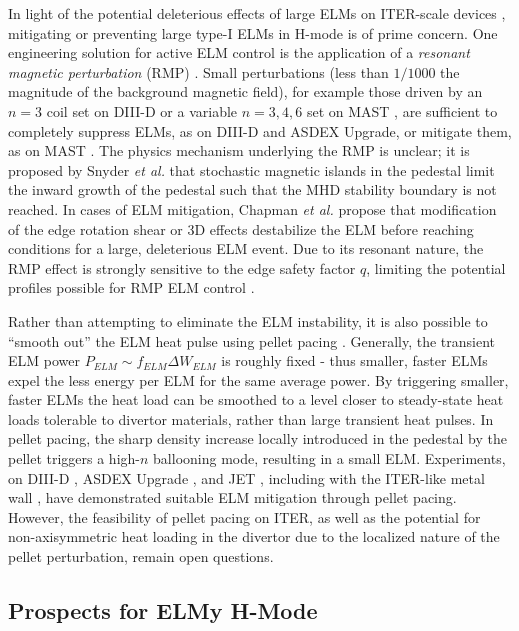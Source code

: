 In light of the potential deleterious effects of large ELMs on ITER-scale devices \cite{Loarte2003,Federici2003}, mitigating or preventing large type-I ELMs in H-mode is of prime concern.  One engineering solution for active ELM control is the application of a \emph{resonant magnetic perturbation} (RMP) \cite{Evans2004,Moyer2005,Evans2006}.  Small perturbations (less than $1/1000$ the magnitude of the background magnetic field), for example those driven by an $n=3$ coil set on DIII-D \cite{Evans2004} or a variable $n=3,4,6$ set on MAST \cite{Kirk2013}, are sufficient to completely suppress ELMs, as on DIII-D and ASDEX Upgrade, or mitigate them, as on MAST \cite{Kirk2013}.  The physics mechanism underlying the RMP is unclear; it is proposed by Snyder \emph{et al.} \cite{Snyder2012} that stochastic magnetic islands in the pedestal limit the inward growth of the pedestal such that the MHD stability boundary is not reached.  In cases of ELM mitigation, Chapman \emph{et al.} \cite{Chapman2012} propose that 
modification of the edge rotation shear or 3D effects destabilize the ELM before reaching conditions for a large, deleterious ELM event.  Due to its resonant nature, the RMP effect is strongly sensitive to the edge safety factor $q$, limiting the potential profiles possible for RMP ELM control \cite{Moyer2005}.

Rather than attempting to eliminate the ELM instability, it is also possible to ``smooth out'' the ELM heat pulse using pellet pacing \cite{Baylor2013}.  Generally, the transient ELM power $P_{ELM} \sim f_{ELM} \Delta W_{ELM}$ is roughly fixed - thus smaller, faster ELMs expel the less energy per ELM for the same average power.  By triggering smaller, faster ELMs the heat load can be smoothed to a level closer to steady-state heat loads tolerable to divertor materials, rather than large transient heat pulses.  In pellet pacing, the sharp density increase locally introduced in the pedestal by the pellet triggers a high-$n$ ballooning mode, resulting in a small ELM.  Experiments, \eg on DIII-D \cite{Baylor2013}, ASDEX Upgrade \cite{Lang2014}, and JET \cite{Lang2011}, including with the ITER-like metal wall \cite{Lang2013}, have demonstrated suitable ELM mitigation through pellet pacing.  However, the feasibility of pellet pacing on ITER, as well as the potential for non-axisymmetric heat loading in the 
divertor due to the localized nature of the pellet perturbation, remain open questions.

\subsection{Prospects for ELMy H-Mode}\label{subsec:hcr_elmy_prospects}

